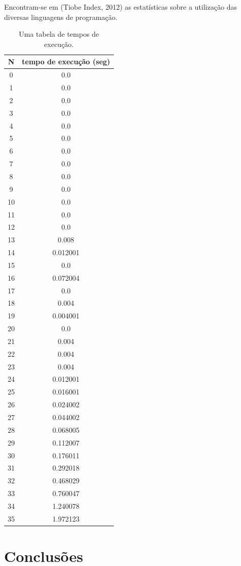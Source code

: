 \documentclass[12pt,a4paper,headsepline,bibtotoc,twoside]{scrbook}
\begin{document}
Encontram-se em (Tiobe Index, 2012)\cite{09:_tiobe_progr_commun_index} as estatísticas sobre a utilização das diversas linguagens de programação.
\begin{table}
  \centering
  \begin{tabular}{c|c}
    N & tempo de execução (seg) \\ \hline
0 & 0.0 \\
1 & 0.0 \\
2 & 0.0 \\
3 & 0.0 \\
4 & 0.0 \\
5 & 0.0 \\
6 & 0.0 \\
7 & 0.0 \\
8 & 0.0 \\
9 & 0.0 \\
10 & 0.0 \\
11 & 0.0 \\
12 & 0.0 \\
13 & 0.008 \\
14 & 0.012001 \\
15 & 0.0 \\
16 & 0.072004 \\
17 & 0.0 \\
18 & 0.004 \\
19 & 0.004001 \\
20 & 0.0 \\
21 & 0.004 \\
22 & 0.004 \\
23 & 0.004 \\
24 & 0.012001 \\
25 & 0.016001 \\
26 & 0.024002 \\
27 & 0.044002 \\
28 & 0.068005 \\
29 & 0.112007 \\
30 & 0.176011 \\
31 & 0.292018 \\
32 & 0.468029 \\
33 & 0.760047 \\
34 & 1.240078 \\
35 & 1.972123
  \end{tabular}
  \caption{Uma tabela de tempos de execução.}
  \label{tab:execucao}
\end{table}

\chapter{Conclusões}
\label{chap:conclu}
\end{document}
